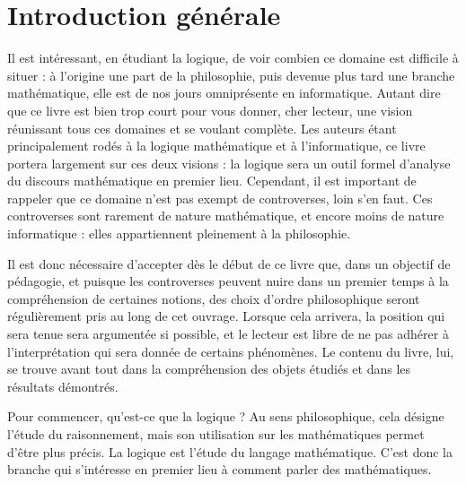 \chapter[Introduction générale]{Introduction générale}

Il est intéressant, en étudiant la logique, de voir combien ce domaine est
difficile à situer : à l'origine une part de la philosophie, puis devenue plus
tard une branche mathématique, elle est de nos jours omniprésente en
informatique. Autant dire que ce livre est bien trop court pour vous donner,
cher lecteur, une vision réunissant tous ces domaines et se voulant complète.
Les auteurs étant principalement rodés à la logique mathématique et à
l'informatique, ce livre portera largement sur ces deux visions : la logique
sera un outil formel d'analyse du discours mathématique en premier lieu.
Cependant, il est important de rappeler que ce domaine n'est pas exempt de
controverses, loin s'en faut. Ces controverses sont rarement de nature
mathématique, et encore moins de nature informatique : elles appartiennent
pleinement à la philosophie.

Il est donc nécessaire d'accepter dès le début de ce livre que, dans un objectif
de pédagogie, et puisque les controverses peuvent nuire dans un premier temps à
la compréhension de certaines notions, des choix d'ordre philosophique seront
régulièrement pris au long de cet ouvrage. Lorsque cela arrivera, la position
qui sera tenue sera argumentée si possible, et le lecteur est libre de ne pas
adhérer à l'interprétation qui sera donnée de certains phénomènes. Le contenu du
livre, lui, se trouve avant tout dans la compréhension des objets étudiés et
dans les résultats démontrés.

Pour commencer, qu'est-ce que la logique ? Au sens philosophique, cela désigne
l'étude du raisonnement, mais son utilisation sur les mathématiques permet
d'être plus précis. La logique est l'étude du langage mathématique. C'est donc
la branche qui s'intéresse en premier lieu à comment parler des mathématiques.

